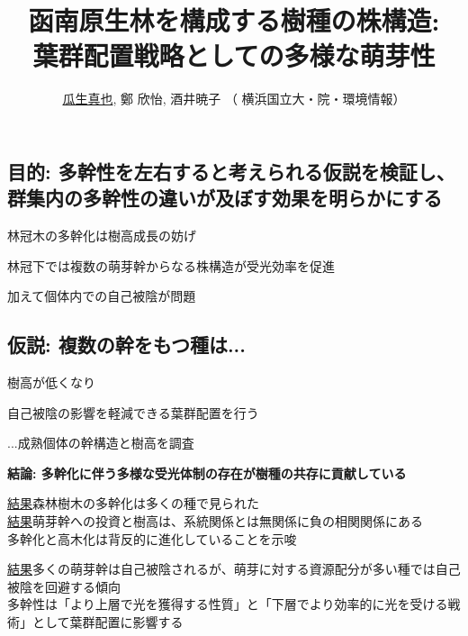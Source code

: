 \documentclass[a0, 36pt, plainboxedsections]{sciposter} %
\title{\textcolor{Blue1}{函南原生林を構成する樹種の株構造:\\葉群配置戦略としての多様な萌芽性}}
\author{\faGroup \hspace{0.02em} \underline{瓜生真也}, 鄭 欣怡, 酒井暁子 （\faUniv \hspace{0.02em} 横浜国立大・院・環境情報） \normalsize{\faEnvelope \hspace{0.02em} \fontspec{ComicSansMS}{suika1127@gmail.com}}}
\begin{document}
\maketitle
\vspace{-2em}
\begin{multicols}{2}
\begin{mdframed}[style=section.frame]
  \centering\huge\textbf{}
\end{mdframed}

\subsection*{目的: 多幹性を左右すると考えられる仮説を検証し、群集内の多幹性の違いが及ぼす効果を明らかにする} %

林冠木の多幹化は樹高成長の妨げ

林冠下では複数の萌芽幹からなる株構造が受光効率を促進

加えて個体内での自己被陰が問題

\subsection*{仮説: 複数の幹をもつ種は...}

\begin{list}{}{\setlength{\itemindent}{1em}} %
 \item 樹高が低くなり
 \item 自己被陰の影響を軽減できる葉群配置を行う
\end{list}

...成熟個体の幹構造と樹高を調査

\columnbreak
\begin{mdframed}[style=conclusion.frame]
  \Large\textbf{\faFlagAlt \vspace{0.02em} 結論: {多幹化に伴う多様な受光体制の存在が樹種の共存に貢献している}} %
  \vspace{0.4em}
  \flushleft\normalsize{
  \underline{結果}森林樹木の多幹化は多くの種で見られた\\
  \underline{結果}萌芽幹への投資と樹高は、系統関係とは無関係に負の相関関係にある\\
  \faHandLeft \vspace{0.02em} 多幹化と高木化は背反的に進化していることを示唆
  
  \vspace{0.4em}
  \underline{結果}多くの萌芽幹は自己被陰されるが、萌芽に対する資源配分が多い種では自己被陰を回避する傾向\\
  \faHandLeft \vspace{0.02em} 多幹性は「より上層で光を獲得する性質」と「下層でより効率的に光を受ける戦術」として葉群配置に影響する %
  }
\end{mdframed}
\end{multicols}
\end{document}
